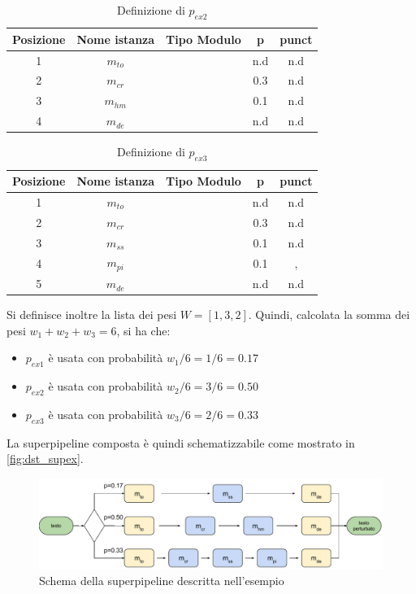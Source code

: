 \begin{table}[H]
\centering
\begin{tabular}{ccccc}
\textbf{Posizione} & \textbf{Nome istanza} & \textbf{Tipo Modulo} & \textbf{p} & \textbf{punct}\\ \hline
1	& $m_{to}$	& \mto	& n.d 	& n.d 	\\
2	& $m_{cr}$	& \mcr	& 0.3	& n.d 	\\
3	& $m_{hm}$	& \mhm	& 0.1	& n.d 	\\
4	& $m_{de}$	& \mde	& n.d 	& n.d 	\\
\end{tabular}
\caption{Definizione di $p_{ex2}$}
\label{tab:dst_pex2}
\end{table}

\begin{table}[H]
\centering
\begin{tabular}{ccccc}
\textbf{Posizione} & \textbf{Nome istanza} & \textbf{Tipo Modulo} & \textbf{p} & \textbf{punct}\\ \hline
1	& $m_{to}$	& \mto	& n.d 	& n.d 	\\
2	& $m_{cr}$	& \mcr	& 0.3	& n.d 	\\
3	& $m_{ss}$	& \mss	& 0.1	& n.d 	\\
4	& $m_{pi}$	& \mpi	& 0.1	& , 	\\
5	& $m_{de}$	& \mde	& n.d 	& n.d 	\\
\end{tabular}
\caption{Definizione di $p_{ex3}$}
\label{tab:dst_pex3}
\end{table}

Si definisce inoltre la lista dei pesi $W =[1,3,2]$. Quindi, calcolata la somma dei pesi $w_1  + w_2 + w_3 = 6$, si ha che:
\begin{itemize}
\item $p_{ex1}$ è usata con probabilità $w_1 / 6 = 1 / 6 = 0.17$
\item $p_{ex2}$ è usata con probabilità $w_2 / 6 = 3 / 6 = 0.50$
\item $p_{ex3}$ è usata con probabilità $w_3 / 6 = 2 / 6 = 0.33$
\end{itemize}

La superpipeline composta è quindi schematizzabile come mostrato in \autoref{fig:dst_supex}.

\begin{figure}[H]
\centering
\includegraphics[width=\textwidth]{immagini/dataset/supex}
\caption{Schema della superpipeline descritta nell'esempio}
\label{fig:dst_supex}
\end{figure}



